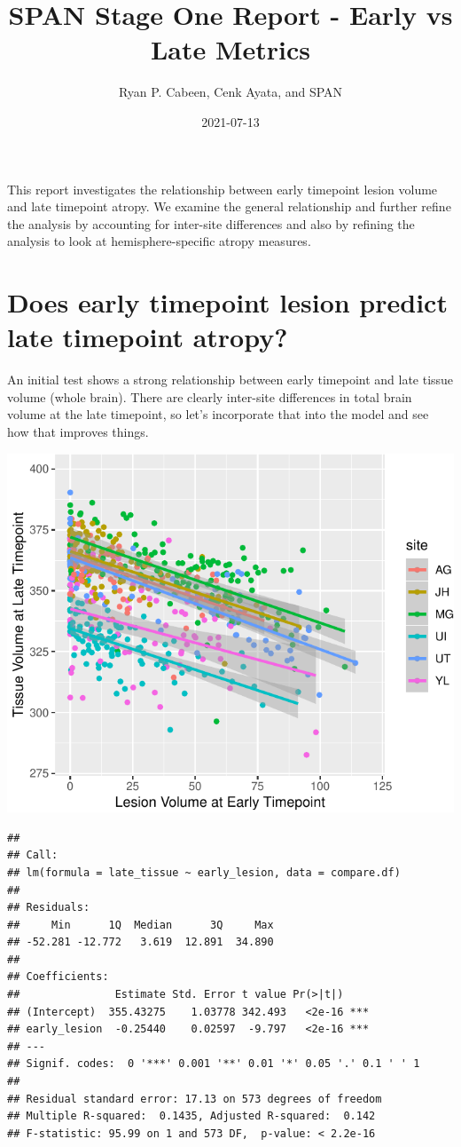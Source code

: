 \documentclass[
]{article}
\title{SPAN Stage One Report - Early vs Late Metrics}
\author{Ryan P. Cabeen, Cenk Ayata, and SPAN}
\date{2021-07-13}
\begin{document}
\maketitle

This report investigates the relationship between early timepoint lesion
volume and late timepoint atropy. We examine the general relationship
and further refine the analysis by accounting for inter-site differences
and also by refining the analysis to look at hemisphere-specific atropy
measures.

\newpage

\hypertarget{does-early-timepoint-lesion-predict-late-timepoint-atropy}{%
\section{Does early timepoint lesion predict late timepoint
atropy?}\label{does-early-timepoint-lesion-predict-late-timepoint-atropy}}

An initial test shows a strong relationship between early timepoint and
late tissue volume (whole brain). There are clearly inter-site
differences in total brain volume at the late timepoint, so let's
incorporate that into the model and see how that improves things.

\begin{center}\includegraphics{paper_files/figure-latex/plot_raw-1} \end{center}

\begin{verbatim}
## 
## Call:
## lm(formula = late_tissue ~ early_lesion, data = compare.df)
## 
## Residuals:
##     Min      1Q  Median      3Q     Max 
## -52.281 -12.772   3.619  12.891  34.890 
## 
## Coefficients:
##               Estimate Std. Error t value Pr(>|t|)    
## (Intercept)  355.43275    1.03778 342.493   <2e-16 ***
## early_lesion  -0.25440    0.02597  -9.797   <2e-16 ***
## ---
## Signif. codes:  0 '***' 0.001 '**' 0.01 '*' 0.05 '.' 0.1 ' ' 1
## 
## Residual standard error: 17.13 on 573 degrees of freedom
## Multiple R-squared:  0.1435, Adjusted R-squared:  0.142 
## F-statistic: 95.99 on 1 and 573 DF,  p-value: < 2.2e-16
\end{verbatim}
\end{document}

